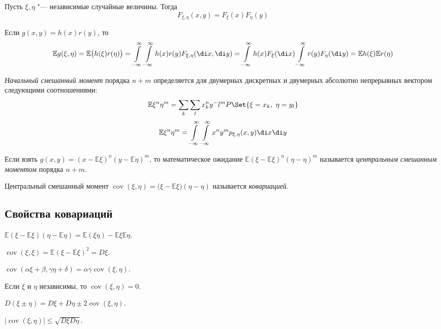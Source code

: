 Пусть $ \xi, \eta $ "--- независимые случайные величины.
Тогда
$$ F_{\xi, \eta}(x, y) = F_\xi(x)F_\eta(y) $$

\begin{statement}
	Если $ g(x, y) = h(x)r(y) $, то
	$$ \mathbb Eg(\xi, \eta) = \mathbb E \bigl( h(\xi)r(\eta) \bigr) =
	\int\limits_{-\infty}^\infty \int\limits_{-\infty}^\infty h(x)r(y) F_{\xi, \eta}(\di x, \di y) =
	\int\limits_{-\infty}^\infty h(x)F_\xi(\di x) \int\limits_{-\infty}^\infty r(y) F_\eta(\di y) =
	\mathbb Eh(\xi) \mathbb E r(\eta) $$
\end{statement}

\begin{definition}
	\emph{Начальный смешанный момент} порядка $ n + m $ определяется для двумерных дискретных и
	двумерных абсолютно непрерывных вектором следующими соотношениями:
	$$ \mathbb E\xi^n \eta^m = \sum_k \sum_l x_k^n y^-l^m P\Set{\xi = x_k, ~ \eta = y_l} $$
	$$ \mathbb E\xi^n\eta^m = \int\limits_{-\infty}^\infty \int\limits_{-\infty}^\infty x^ny^m
	p_{\xi, \eta}(x, y) \di x \di y $$
\end{definition}

\begin{definition}
	Если взять $ g(x, y) = (x - \mathbb E\xi)^n (y - \mathbb E\eta)^m $, то математическое ожидание
	$ \mathbb E(\xi - \mathbb E\xi)^n(\eta - \mathbb \eta)^m $ называется
	\emph{центральным смешанным моментом} порядка $ n + m $.
\end{definition}

\begin{definition}
	Центральный смешанный момент $ \operatorname{cov}(\xi, \eta) =
	\mathbb (\xi - \mathbb E\xi)(\eta - \mathbb \eta) $ называется \emph{ковариацией}.
\end{definition}

\subsection{Свойства ковариаций}

\begin{props}
\item $ \mathbb E(\xi - \mathbb E\xi)(\eta - \mathbb E\eta) =
	\mathbb E(\xi\eta) - \mathbb E\xi \mathbb E \eta $.
\item $ \operatorname{cov}(\xi, \xi) = \mathbb E(\xi - \mathbb E \xi)^2 = D\xi $.
\item $ \operatorname{cov}(\alpha \xi + \beta, \gamma \eta + \delta) =
	\alpha \gamma \operatorname{cov}(\xi ,\eta) $.
\item Если $ \xi $ и $ \eta $ независимы, то $ \operatorname{cov}(\xi, \eta) = 0 $.
\item $ D(\xi \pm \eta) = D\xi + D\eta \pm 2\operatorname{cov}(\xi, \eta) $.
\item $ |\operatorname{cov}(\xi, \eta)| \le \sqrt{D\xi D\eta} $.
\end{props}

